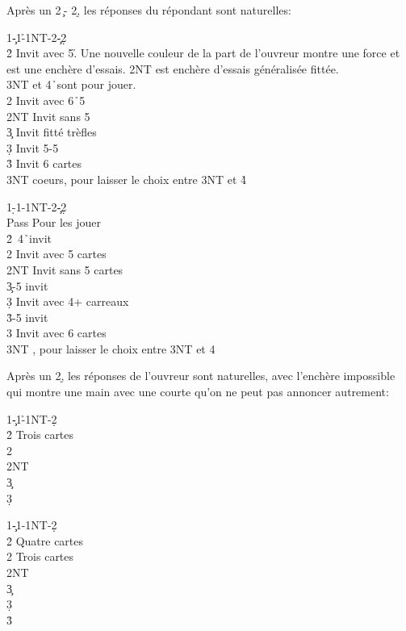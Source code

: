 \documentclass[a4paper]{article}
\begin{document}
Après un 2\c\ - 2\d , les réponses du répondant sont naturelles:

\begin{bidtable}
1\c-1\h-1NT-2\c-2\d\+\\
2\h \> Invit avec 5\h . Une nouvelle couleur de la part de l'ouvreur montre une force et\\
\>est une enchère d'essais. 2NT est enchère d'essais généralisée fittée.\\
\>3NT et 4\h\ sont pour jouer.\\
2\s \> Invit avec 6\h\ 5\s \\
2NT \> Invit sans 5\h \\
3\c \> Invit fitté trèfles\\
3\d \> Invit 5-5\\
3\h \> Invit 6 cartes\\
3NT  coeurs, pour laisser le choix entre 3NT et 4\h \-
\end{bidtable}

\begin{bidtable}
1\d-1\s-1NT-2\c-2\d\+\\
Pass \> Pour les jouer\\
2\h {}\s\ 4\h\ invit\\
2\s \> Invit avec 5 cartes\\
2NT \> Invit sans 5 cartes\\
3\c {}-5 invit\\
3\d \> Invit avec 4+ carreaux\\
3\h {}-5 invit\\
3\s \> Invit avec 6 cartes\\
3NT \s , pour laisser le choix entre 3NT et 4\s \-
\end{bidtable}

Après un 2\d , les réponses de l'ouvreur sont naturelles, avec l'enchère impossible
qui montre une main avec une courte qu'on ne peut pas annoncer autrement:

\begin{bidtable}
1\c-1\h-1NT-2\d\+\\
2\h \> Trois cartes\\
2\s {}\\
2NT \\
3\c {}\\
3\d {}\-
\end{bidtable}

\begin{bidtable}
1\c-1\s-1NT-2\d\+\\
2\h \> Quatre cartes\\
2\s \> Trois cartes\\
2NT \\
3\c {}\\
3\d {}\\
3\h {}\-
\end{bidtable}
\end{document}

